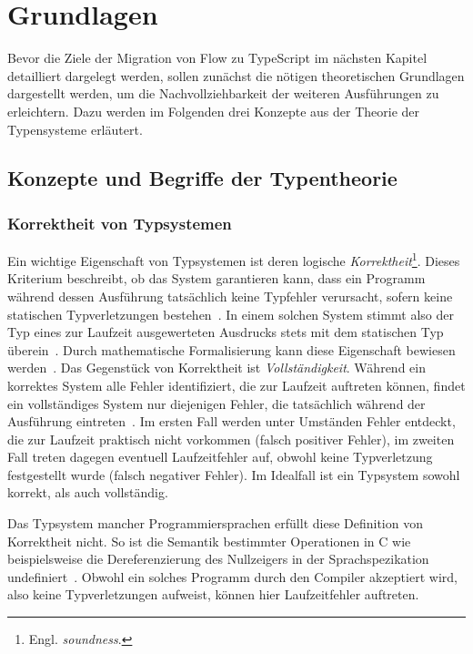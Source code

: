 \chapter{Grundlagen}
\label{chap:basics}

Bevor die Ziele der Migration von Flow zu TypeScript im nächsten Kapitel detailliert dargelegt werden, sollen zunächst die nötigen theoretischen Grundlagen dargestellt werden, um die Nachvollziehbarkeit der weiteren Ausführungen zu erleichtern. Dazu werden im Folgenden drei Konzepte aus der Theorie der Typensysteme erläutert.

\section{Konzepte und Begriffe der Typentheorie}

\subsection{Korrektheit von Typsystemen}
Ein wichtige Eigenschaft von Typsystemen ist deren logische \emph{Korrektheit}\footnote{Engl. \textit{soundness}.}. Dieses Kriterium beschreibt, ob das System garantieren kann, dass ein Programm während dessen Ausführung tatsächlich keine Typfehler verursacht, sofern keine statischen Typverletzungen bestehen~\autocite{WRIGHT:1994}. In einem solchen System stimmt also der Typ eines zur Laufzeit ausgewerteten Ausdrucks stets mit dem statischen Typ überein~\autocite{DART:TYPE_SYSTEM}. Durch mathematische Formalisierung kann diese Eigenschaft bewiesen werden~\autocite[7]{CARDELLI:TYPE_SYSTEMS}. Das Gegenstück von Korrektheit ist \textit{Vollständigkeit}. Während ein korrektes System alle Fehler identifiziert, die zur Laufzeit auftreten können, findet ein vollständiges System nur diejenigen Fehler, die tatsächlich während der Ausführung eintreten~\autocite{FLOW:TYPES_AND_EXPRESSIONS}. Im ersten Fall werden unter Umständen Fehler entdeckt, die zur Laufzeit praktisch nicht vorkommen (falsch positiver Fehler), im zweiten Fall treten dagegen eventuell Laufzeitfehler auf, obwohl keine Typverletzung festgestellt wurde (falsch negativer Fehler). Im Idealfall ist ein Typsystem sowohl korrekt, als auch vollständig.

Das Typsystem mancher Programmiersprachen erfüllt diese Definition von Korrektheit nicht. So ist die Semantik bestimmter Operationen in C wie beispielsweise die Dereferenzierung des Nullzeigers in der Sprachspezikation undefiniert~\autocite[79]{ISO:C99}. Obwohl ein solches Programm durch den Compiler akzeptiert wird, also keine Typverletzungen aufweist, können hier Laufzeitfehler auftreten.

